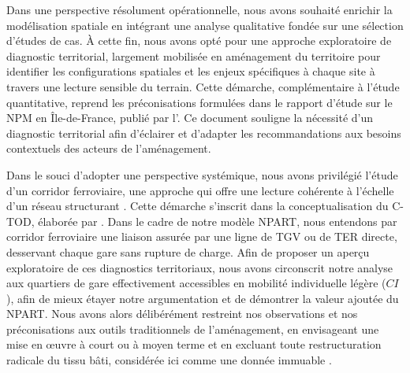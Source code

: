 \begin{refsegment}
Dans une perspective résolument opérationnelle, nous avons souhaité enrichir la modélisation spatiale en intégrant une analyse qualitative fondée sur une sélection d'études de cas. À cette fin, nous avons opté pour une approche exploratoire de diagnostic territorial, largement mobilisée en aménagement du territoire pour identifier les configurations spatiales et les enjeux spécifiques à chaque site à travers une lecture sensible du terrain. Cette démarche, complémentaire à l'étude quantitative, reprend les préconisations formulées dans le rapport d'étude sur le \acrshort{NPM} en Île-de-France, publié par l'\textcolor{blue}{\textcite[5]{iau_articulation_2017}}. Ce document souligne la nécessité d'un diagnostic territorial afin d'éclairer et d'adapter les recommandations aux besoins contextuels des acteurs de l'aménagement.%

Dans le souci d'adopter une perspective systémique, nous avons privilégié l'étude d'un corridor ferroviaire, une approche qui offre une lecture cohérente à l'échelle d'un réseau structurant \textcolor{blue}{\autocite{bairras_slow_2025}}. Cette démarche s'inscrit dans la conceptualisation du \acrfull{C-TOD}, élaborée par \textcolor{blue}{\textcite[17]{liu_conceptual_2020}}. Dans le cadre de notre modèle \acrshort{NPART}, nous entendons par corridor ferroviaire une liaison assurée par une ligne de \acrshort{TGV} ou de \acrshort{TER} directe, desservant chaque gare sans rupture de charge. Afin de proposer un aperçu exploratoire de ces diagnostics territoriaux, nous avons circonscrit notre analyse aux quartiers de gare effectivement accessibles en mobilité individuelle légère (\(CI\)), afin de mieux étayer notre argumentation et de démontrer la valeur ajoutée du \acrshort{NPART}. Nous avons alors délibérément restreint nos observations et nos préconisations aux outils traditionnels de l'aménagement, en envisageant une mise en œuvre à court ou à moyen terme et en excluant toute restructuration radicale du tissu bâti, considérée ici comme une donnée immuable \textcolor{blue}{\autocite[45]{stransky_periurbain_2019}}.%


\end{refsegment}
